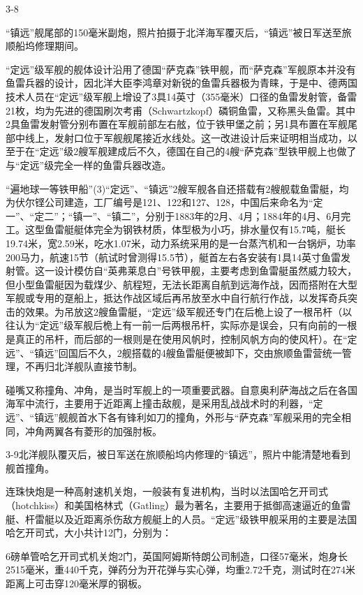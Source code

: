 \documentclass[12pt,UTF8]{ctexbook}
\begin{document}
3-8

“镇远”舰尾部的150毫米副炮，照片拍摄于北洋海军覆灭后，“镇远”被日军送至旅顺船坞修理期间。

“定远”级军舰的舰体设计沿用了德国“萨克森”铁甲舰，而“萨克森”军舰原本并没有鱼雷兵器的设计，因北洋大臣李鸿章对新锐的鱼雷兵器极为青睐，于是中、德两国技术人员在“定远”级军舰上增设了3具14英寸（355毫米）口径的鱼雷发射管，备雷21枚，均为先进的德国刷次考甫（Schwartzkopf）磷铜鱼雷，又称黑头鱼雷。其中2具鱼雷发射管分别布置在军舰前部左右舷，位于铁甲堡之前；另1具布置在军舰尾部中线上，发射口位于军舰舰尾接近水线处。这一改进设计后来证明相当成功，以至于在“定远”级2艘军舰建成后不久，德国在自己的4艘“萨克森”型铁甲舰上也做了与“定远”级完全一样的鱼雷兵器改造。

“遍地球一等铁甲船”(3)“定远”、“镇远”2艘军舰各自还搭载有2艘舰载鱼雷艇，均为伏尔铿公司建造，工厂编号是121、122和127、128，中国后来命名为“定一”、“定二”；“镇一”、“镇二”，分别于1883年的2月、4月；1884年的4月、6月完工。这型鱼雷艇艇体完全为钢铁材质，体型极为小巧，排水量仅有15.7吨，艇长19.74米，宽2.59米，吃水1.07米，动力系统采用的是一台蒸汽机和一台锅炉，功率200马力，航速15节（航试时曾测得15.5节），艇首左右各安装有1具14英寸鱼雷发射管。这一设计模仿自“英弗莱息白”号铁甲舰，主要考虑到鱼雷艇虽然威力较大，但小型鱼雷艇因为载煤少、航程短，无法长距离自航到远海作战，因而搭附在大型军舰或专用的趸船上，抵达作战区域后再吊放至水中自行航行作战，以发挥奇兵突击的效果。为吊放这2艘鱼雷艇，“定远”级军舰还专门在后桅上设了一根吊杆（以往认为“定远”级军舰后桅上有一前一后两根吊杆，实际亦是误会，只有向前的一根是真正的吊杆，而后部的一根则是在使用风帆时，控制风帆方向的使风杆）。在“定远”、“镇远”回国后不久，2舰搭载的4艘鱼雷艇便被卸下，交由旅顺鱼雷营统一管理，不再归北洋舰队直接节制。

碰嘴又称撞角、冲角，是当时军舰上的一项重要武器。自意奥利萨海战之后在各国海军中流行，主要用于近距离上撞击敌舰，是采用乱战战术时的利器，“定远”、“镇远”舰舰首水下各有锋利如刀的撞角，外形与“萨克森”军舰采用的完全相同，冲角两翼各有菱形的加强肘板。

3-9北洋舰队覆灭后，被日军送在旅顺船坞内修理的“镇远”，照片中能清楚地看到舰首撞角。

连珠快炮是一种高射速机关炮，一般装有复进机构，当时以法国哈乞开司式（hotchkiss）和美国格林式（Gatling）最为著名，主要用于抵御高速逼近的鱼雷艇、杆雷艇以及近距离杀伤敌方舰艇上的人员。“定远”级铁甲舰采用的主要是法国哈乞开司式，大小共计12门，分别为：

6磅单管哈乞开司式机关炮2门，英国阿姆斯特朗公司制造，口径57毫米，炮身长2515毫米，重440千克，弹药分为开花弹与实心弹，均重2.72千克，测试时在274米距离上可击穿120毫米厚的钢板。
\end{document}
